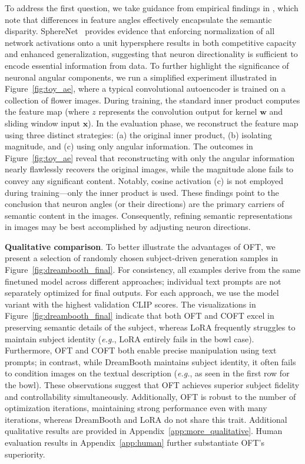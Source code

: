 \begin{itemize}[leftmargin=*,nosep]
To address the first question, we take guidance from empirical findings in \cite{liu2018decoupled,chen2020angular}, which note that differences in feature angles effectively encapsulate the semantic disparity. SphereNet~\cite{liu2017deep} provides evidence that enforcing normalization of all network activations onto a unit hypersphere results in both competitive capacity and enhanced generalization, suggesting that neuron directionality is sufficient to encode essential information from data. To further highlight the significance of neuronal angular components, we run a simplified experiment illustrated in Figure~\ref{fig:toy_ae}, where a typical convolutional autoencoder is trained on a collection of flower images. During training, the standard inner product computes the feature map (where $z$ represents the convolution output for kernel $\bm{w}$ and sliding window input $\bm{x}$). In the evaluation phase, we reconstruct the feature map using three distinct strategies: (a) the original inner product, (b) isolating magnitude, and (c) using only angular information. The outcomes in Figure~\ref{fig:toy_ae} reveal that reconstructing with only the angular information nearly flawlessly recovers the original images, while the magnitude alone fails to convey any significant content. Notably, cosine activation (c) is not employed during training—only the inner product is used. These findings point to the conclusion that neuron angles (or their directions) are the primary carriers of semantic content in the images. Consequently, refining semantic representations in images may be best accomplished by adjusting neuron directions.

\textbf{Qualitative comparison}. To better illustrate the advantages of OFT, we present a selection of randomly chosen subject-driven generation samples in Figure~\ref{fig:dreambooth_final}. For consistency, all examples derive from the same finetuned model across different approaches; individual text prompts are not separately optimized for final outputs. For each approach, we use the model variant with the highest validation CLIP scores. The visualizations in Figure~\ref{fig:dreambooth_final} indicate that both OFT and COFT excel in preserving semantic details of the subject, whereas LoRA frequently struggles to maintain subject identity (\emph{e.g.}, LoRA entirely fails in the bowl case). Furthermore, OFT and COFT both enable precise manipulation using text prompts; in contrast, while DreamBooth maintains subject identity, it often fails to condition images on the textual description (\emph{e.g.}, as seen in the first row for the bowl). These observations suggest that OFT achieves superior subject fidelity and controllability simultaneously. Additionally, OFT is robust to the number of optimization iterations, maintaining strong performance even with many iterations, whereas DreamBooth and LoRA do not share this trait. Additional qualitative results are provided in Appendix~\ref{app:more_qualitative}. Human evaluation results in Appendix~\ref{app:human} further substantiate OFT’s superiority.


\end{itemize}
